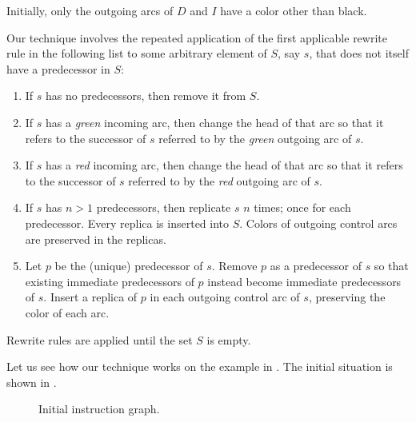 Initially, only the outgoing arcs of $D$ and $I$ have a color
other than black.

Our technique involves the repeated application of the first
applicable rewrite rule in the following list to some arbitrary
element of $S$, say $s$, that does not itself have a predecessor in
$S$:

\begin{enumerate}
\item If $s$ has no predecessors, then remove it from $S$.
\item If $s$ has a \emph{green} incoming arc, then change the head
  of that arc so that it refers to the successor of $s$ referred to
  by the \emph{green} outgoing arc of $s$.
\item If $s$ has a \emph{red} incoming arc, then change the head
  of that arc so that it refers to the successor of $s$ referred to
  by the \emph{red} outgoing arc of $s$.
\item If $s$ has $n>1$ predecessors, then replicate $s$ $n$ times;
  once for each predecessor.  Every replica is inserted into $S$.
  Colors of outgoing control arcs are preserved in the replicas.
\item Let $p$ be the (unique) predecessor of $s$.  Remove $p$ as a
  predecessor of $s$ so that existing immediate predecessors of $p$
  instead become immediate predecessors of $s$.  Insert a replica of
  $p$ in each outgoing control arc of $s$, preserving the color of
  each arc.
\end{enumerate}

\noindent
Rewrite rules are applied until the set $S$ is empty.

Let us see how our technique works on the example in
.  The initial situation is shown in
.

\begin{figure}
\begin{center}
\end{center}
\caption{\label{fig-rewrite-1}
Initial instruction graph.}
\end{figure}
